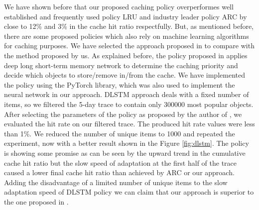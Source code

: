 We have shown before that our proposed caching policy overperformes well established and frequently used policy LRU and industry leader policy ARC by close to 12\% and 3\% in the cache hit ratio respectfully. But, as mentioned before, there are some proposed policies which also rely on machine learning algorithms for caching purposes. We have selected the approach proposed in \cite{23} to compare with the method proposed by us. As explained before, the policy proposed in \cite{23} applies deep long short-term memory network to determine the caching priority and decide which objects to store/remove in/from the cache. We have implemented the policy using the PyTorch library, which was also used to implement the neural network in our approach. DLSTM approach deals with a fixed number of items, so we filtered the 5-day trace to contain only $300 000$ most popular objects. After selecting the parameters of the policy as proposed by the author of \cite{23}, we evaluated the hit rate on our filtered trace. The produced hit rate values were less than 1\%. We reduced the number of unique items to 1000 and repeated the experiment, now with a better result shown in the Figure \ref{fig:dlstm}. The policy is showing some promise as can be seen by the upward trend in the cumulative cache hit ratio but the slow speed of adaptation at the first half of the trace caused a lower final cache hit ratio than achieved by ARC or our approach. Adding the disadvantage of a limited number of unique items to the slow adaptation speed of DLSTM policy we can claim that our approach is superior to the one proposed in \cite{23}.

